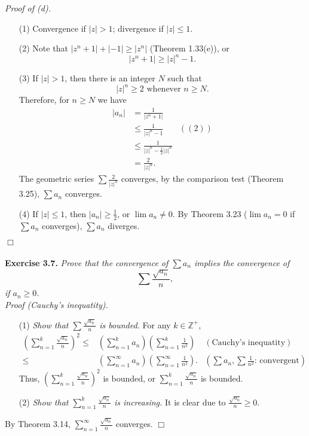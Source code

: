 \documentclass{article}
\begin{document}
\emph{Proof of (d).}
\begin{enumerate}
\item[(1)]
Convergence if $|z| > 1$; divergence if $|z| \leq 1$.
\item[(2)]
Note that
$|z^n+1| + |-1| \geq |z^n|$
(Theorem 1.33(e)),
or
$$|z^n+1| \geq |z|^n - 1.$$
\item[(3)]
If $|z| > 1$, then there is an integer $N$ such that
$$|z|^n \geq 2 \text{ whenever } n \geq N.$$
Therefore, for $n \geq N$ we have
  \begin{align*}
    |a_n|
    &= \frac{1}{|z^n+1|} \\
    &\leq \frac{1}{|z|^n - 1}
      &((2)) \\
    &\leq \frac{1}{|z|^n - \frac{1}{2}|z|^n} \\
    &= \frac{2}{|z|^n}.
  \end{align*}
The geometric series $\sum \frac{2}{|z|^n}$ converges,
by the comparison test (Theorem 3.25), $\sum a_n$ converges.
\item[(4)]
If $|z| \leq 1$, then $|a_n| \geq \frac{1}{2}$,
or $\lim a_n \neq 0$.
By Theorem 3.23 ($\lim a_n = 0$ if $\sum a_n$ converges),
$\sum a_n$ diverges.
\end{enumerate}
$\Box$ \\\\






\textbf{Exercise 3.7.}
\emph{Prove that the convergence of $\sum a_n$ implies the convergence of
$$\sum \frac{\sqrt{a_n}}{n},$$
if $a_n \geq 0$.} \\

\emph{Proof (Cauchy's inequatity).}
\begin{enumerate}
\item[(1)]
\emph{Show that $\sum\frac{\sqrt{a_n}}{n}$ is bounded.}
For any $k \in \mathbb{Z}^{+}$,
\begin{align*}
\left( \sum_{n=1}^{k} \frac{\sqrt{a_n}}{n} \right)^2
\leq&
\left( \sum_{n=1}^{k}{a_n} \right)
\left( \sum_{n=1}^{k}{\frac{1}{n^2}} \right)
  &(\text{Cauchy's inequatity}) \\
\leq& \left( \sum^{\infty}_{n=1}{a_n} \right)
\left( \sum^{\infty}_{n=1}{\frac{1}{n^2}} \right).
  &\left(\text{$\sum{a_n}, \sum{\frac{1}{n^2}}$: convergent}\right)
\end{align*}
Thus,
$\left( \sum_{n=1}^{k}\frac{\sqrt{a_n}}{n} \right)^2$ is bounded,
or $\sum_{n=1}^{k}\frac{\sqrt{a_n}}{n}$ is bounded.
\item[(2)]
\emph{Show that $\sum_{n=1}^{k} \frac{\sqrt{a_n}}{n}$ is increasing.}
It is clear due to $\frac{\sqrt{a_n}}{n} \geq 0$.
\end{enumerate}
By Theorem 3.14, $\sum_{n=1}^{\infty} \frac{\sqrt{a_n}}{n}$ converges.
$\Box$ \\
\end{document}
